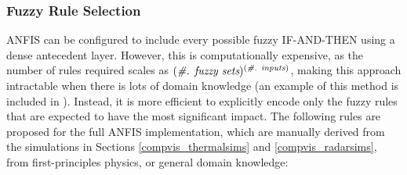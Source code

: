         
    \subsubsection{Fuzzy Rule Selection} \label{fuzzy_rules}
    

        ANFIS can be configured to include every possible fuzzy IF-AND-THEN using a dense antecedent layer. However, this is computationally expensive, as the number of rules required scales as \newline \((\textit{\#. fuzzy sets})^\text{(\textit{\#. inputs})}\), making this approach intractable when there is lots of domain knowledge (an example of this method is included in \cite{jang1993anfis}). Instead, it is more efficient to explicitly encode only the fuzzy rules that are expected to have the most significant impact. The following rules are proposed for the full ANFIS implementation, which are manually derived from the simulations in Sections \ref{compvis_thermalsims} and \ref{compvis_radarsims}, from first-principles physics, or general domain knowledge:
        
